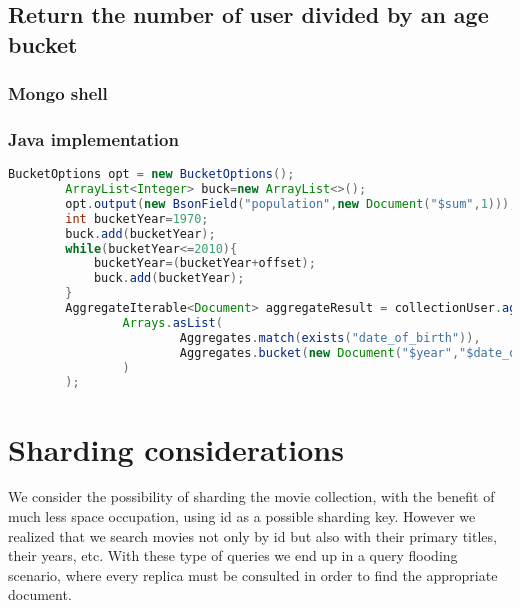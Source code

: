 \subsection{Return the number of user divided by an age bucket}\label{subsec:userPopulationBucket}
\subsubsection{Mongo shell}


\subsubsection{Java implementation}
\begin{lstlisting}[language=Java, caption = AdminMongoDBDAO.java]
BucketOptions opt = new BucketOptions();
        ArrayList<Integer> buck=new ArrayList<>();
        opt.output(new BsonField("population",new Document("$sum",1)));
        int bucketYear=1970;
        buck.add(bucketYear);
        while(bucketYear<=2010){
            bucketYear=(bucketYear+offset);
            buck.add(bucketYear);
        }
        AggregateIterable<Document> aggregateResult = collectionUser.aggregate(
                Arrays.asList(
                        Aggregates.match(exists("date_of_birth")),
                        Aggregates.bucket(new Document("$year","$date_of_birth"),buck,opt)
                )
        );
\end{lstlisting}

\section{Sharding considerations}
We consider the possibility of sharding the movie collection, with the benefit of much less space occupation, using id as a possible sharding key. However we realized that we search movies not only by id but also with their primary titles, their years, etc. With these type of queries we end up in a query flooding scenario, where every replica must be consulted in order to find the appropriate document.
